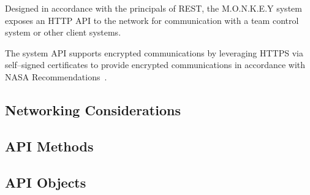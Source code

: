 Designed in accordance with the principals of REST, the M.O.N.K.E.Y system exposes an HTTP API to
the network for communication with a team control system or other client systems.

The system API supports encrypted communications by leveraging HTTPS via self--signed certificates
to provide encrypted communications in accordance with NASA
Recommendations~\cite[p.~30]{nasa-comp-2021}.

\subsection{Networking Considerations}\label{subsec:networking-considerations}

\subsection{API Methods}\label{subsec:api-methods}

\subsection{API Objects}\label{subsec:api-objects}
